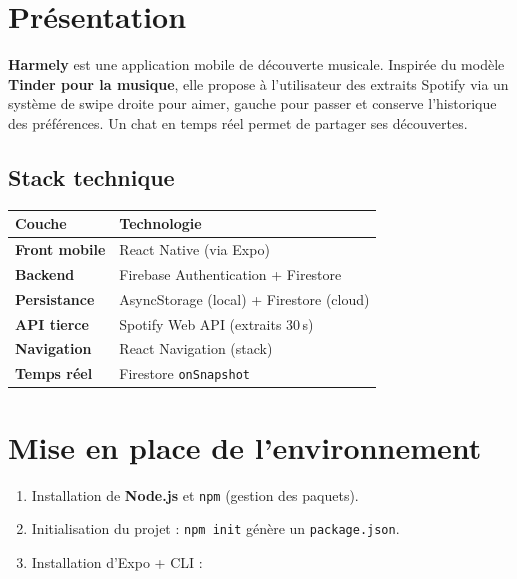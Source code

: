 \documentclass[11pt,a4paper]{article}
\begin{document}
\setcounter{page}{1}

{\sffamily
\hypersetup{linkcolor=primary}
\renewcommand{\contentsname}{\textcolor{accent}{\faList~} Sommaire}
\tableofcontents
}
\vspace{0.4cm}

\section{Présentation}

\begin{infobox}[title={\faRocket~Pitch produit}]
\textbf{Harmely} est une application mobile de découverte musicale. Inspirée du modèle \textbf{Tinder pour la musique}, elle propose à l'utilisateur des extraits Spotify via un système de swipe \textemdash{} droite pour aimer, gauche pour passer \textemdash{} et conserve l'historique des préférences. Un chat en temps réel permet de partager ses découvertes.
\end{infobox}

\subsection{Stack technique}

\renewcommand{\arraystretch}{1.3}
\begin{tabularx}{\linewidth}{@{}>{\bfseries}p{3.5cm} X@{}}
\toprule
\rowcolor{light} Couche & Technologie \\ \midrule
Front mobile      & React Native (via Expo) \\
Backend           & Firebase Authentication + Firestore \\
Persistance       & AsyncStorage (local) + Firestore (cloud) \\
API tierce        & Spotify Web API (extraits 30\,s) \\
Navigation        & React Navigation (stack) \\
Temps réel        & Firestore \texttt{onSnapshot} \\
\bottomrule
\end{tabularx}

\section{Mise en place de l'environnement}

\begin{enumerate}
  \item Installation de \textbf{Node.js} et \texttt{npm} (gestion des paquets).
  \item Initialisation du projet : \texttt{npm init} génère un \texttt{package.json}.
  \item Installation d'Expo + CLI :
\end{enumerate}
\end{document}
